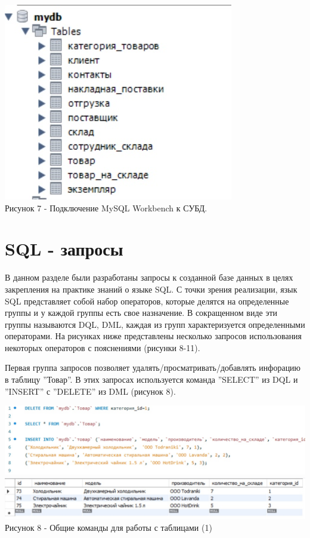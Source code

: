 \documentclass[14pt]{extreport}
\begin{document}
\begin{center}
    \centering
    \includegraphics[width=0.5\linewidth]{image5.png}
    \\Рисунок 7 - Подключение MySQL Workbench к СУБД.
\end{center}

\section{SQL - запросы}
В данном разделе были разработаны запросы к созданной базе данных в
целях закрепления на практике знаний о языке SQL. С точки зрения реализации, язык SQL представляет собой набор операторов, которые делятся на определенные группы и у каждой группы есть свое назначение. В сокращенном виде эти группы называются DQL, DML, каждая из групп характеризуется определенными операторами. На рисунках ниже представлены несколько запросов использования некоторых операторов с пояснениями (рисунки 8-11).


Первая группа запросов позволяет удалять/просматривать/добавлять инфорацию в таблицу ''Товар''. В этих запросах используется команда ''SELECT'' из DQL и ''INSERT'' с ''DELETE'' из DML (рисунок 8). 
\begin{center}
    \centering
    \includegraphics[width=1.0\linewidth]{image1.png}
    \includegraphics[width=1.0\linewidth]{image.png}
    \\Рисунок 8 - Общие команды для работы с таблицами (1)
\end{center}
\end{document}
